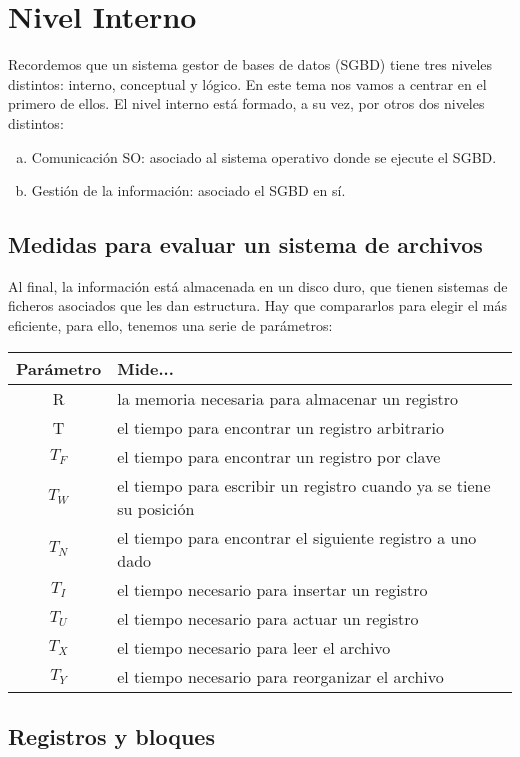 \chapter{Nivel Interno}

Recordemos que un sistema gestor de bases de datos (SGBD) tiene tres niveles distintos: interno, conceptual y lógico. En este tema nos vamos a centrar en el primero de ellos. El nivel interno está formado, a su vez, por otros dos niveles distintos:
\begin{enumerate}[(a)]
\item Comunicación SO: asociado al sistema operativo donde se ejecute el SGBD.
\item Gestión de la información: asociado el SGBD en sí.
\end{enumerate}

\section{Medidas para evaluar un sistema de archivos}

Al final, la información está almacenada en un disco duro, que tienen sistemas de ficheros asociados que les dan estructura. Hay que compararlos para elegir el más eficiente, para ello, tenemos una serie de parámetros:
\begin{center}
\begin{tabular}{|c|l|}
\hline
Parámetro & Mide...\\
\hline
R & la memoria necesaria para almacenar un registro \\
\hline
T & el tiempo para encontrar un registro arbitrario \\
\hline
$T_F$ & el tiempo para encontrar un registro por clave \\
\hline
$T_W$ & el tiempo para escribir un registro cuando ya se tiene su posición \\
\hline
$T_N$ & el tiempo para encontrar el siguiente registro a uno dado \\
\hline
$T_I$ & el tiempo necesario para insertar un registro \\
\hline
$T_U$ & el tiempo necesario para actuar un registro \\
\hline
$T_X$ & el tiempo necesario para leer el archivo \\
\hline
$T_Y$ & el tiempo necesario para reorganizar el archivo \\
\hline
\end{tabular}
\end{center}
\section{Registros y bloques}

